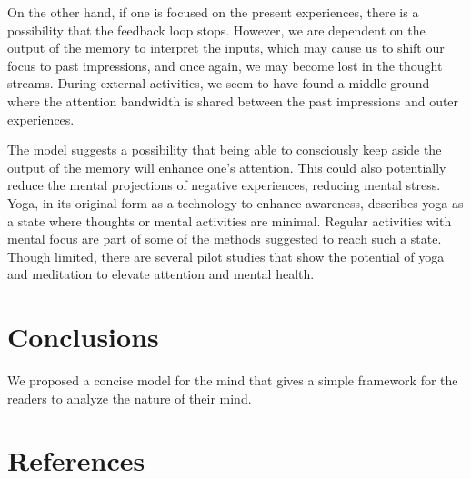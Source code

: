 \documentclass[reprint,amsmath,amssymb,apr,aip,onecolumn, 11pt]{revtex4-1}
\begin{document}
On the other hand, if one is focused on the present experiences, there is a possibility that the feedback loop stops.  However, we are dependent on the output of the memory to interpret the inputs, which may cause us to shift our focus to past impressions, and once again, we may become lost in the thought streams. During external activities, we seem to have found a middle ground where the attention bandwidth is shared between the past impressions and outer experiences. 

The model suggests a possibility that being able to consciously keep aside the output of the memory will enhance one's attention. This could also potentially reduce the mental projections of negative experiences, reducing mental stress. Yoga, in its original form as a technology to enhance awareness, describes yoga as a state where thoughts or mental activities are minimal. Regular activities with mental focus are part of some of the methods suggested to reach such a state\cite{Vivekananda_1896}. Though limited, there are several pilot studies that show the potential of yoga and meditation to elevate attention and mental health\cite{Lazar_2005, Tang_2007, Sadhasivam_2021, Banks_2025}.

	
	\section{Conclusions}
	We proposed a concise model for the mind that gives a simple framework for the readers to analyze the nature of their mind.  
	
	
	
	
	\section*{References}
	
	
	
	
	
		
	\clearpage
	
	
\end{document}
